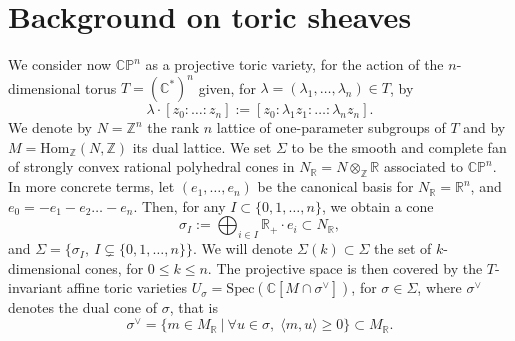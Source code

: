 \documentclass[a4paper,10pt]{amsart}
\theoremstyle{plain}{
    \newtheorem{theorem}{Theorem}[section]
    \newtheorem{lemma}[theorem]{Lemma}
    \newtheorem{corollary}[theorem]{Corollary}
    \newtheorem{proposition}[theorem]{Proposition}
    \newtheorem{conjecture}[theorem]{Conjecture}
}
\theoremstyle{definition}{
    \newtheorem{definition}[theorem]{Definition}
    \newtheorem{defn-thm}[theorem]{Definition-Theorem}
    \newtheorem{example}[theorem]{Example}
    \newtheorem{notation}[theorem]{Notation}
}
\theoremstyle{remark}{
    \newtheorem{remark}[theorem]{Remark}
    \newtheorem{problem}[theorem]{Problem}
    \newtheorem{question}[theorem]{Question}
}
\def\R{\mathbb{R}}
\def\Z{\mathbb{Z}}
\def\P{\mathbb{P}}
\def\C{\mathbb{C}}
\def\Hom{\mathrm{Hom}}
\def\Spec{\mathrm{Spec}}
\begin{document}
\section{Background on toric sheaves}
\label{sec:background}
We consider now $\C\P^n$ as a projective toric variety, for the action of the $n$-dimensional torus $T= (\C^*)^n$ given, for $\lambda=(\lambda_1,\ldots,\lambda_n)\in T$, by 
$$
\lambda\cdot [z_0:\ldots:z_n]:=[z_0:\lambda_1 z_1:\ldots:\lambda_n z_n].
$$
 We denote by $N=\Z^n$ the rank $n$ lattice of one-parameter subgroups of $T$ and by $M=\Hom_\Z(N,\Z)$ its dual lattice. We set $\Sigma$ to be the smooth and complete fan of strongly convex rational polyhedral cones in $N_\R=N\otimes_\Z \R$ associated to $\C\P^n$. In more concrete terms, let $(e_1,\ldots, e_n)$ be the canonical basis for $N_\R=\R^n$, and $e_0=-e_1-e_2\ldots-e_n$. Then, for any $I\subset \lbrace 0,1,\ldots, n\rbrace$, we obtain a cone 
 $$
 \sigma_I:=\bigoplus_{i\in I} \R_+\cdot e_i \subset N_\R,
 $$
 and $\Sigma=\lbrace \sigma_I,\: I\subsetneq \lbrace 0,1,\ldots, n\rbrace \rbrace$. We will denote $\Sigma(k)\subset \Sigma$ the set of $k$-dimensional cones, for $0\leq k\leq n$. The projective space is then covered by the $T$-invariant affine toric varieties $U_\sigma=\Spec(\C[M\cap\sigma^\vee])$, for $\sigma\in \Sigma$, where $\sigma^\vee$ denotes the dual cone of $\sigma$, that is
 $$
 \sigma^\vee=\lbrace m\in M_\R\: \vert\: \forall u\in\sigma,\;\langle m,u \rangle\geq 0 \rbrace \subset M_\R.
 $$
 
\end{document}
